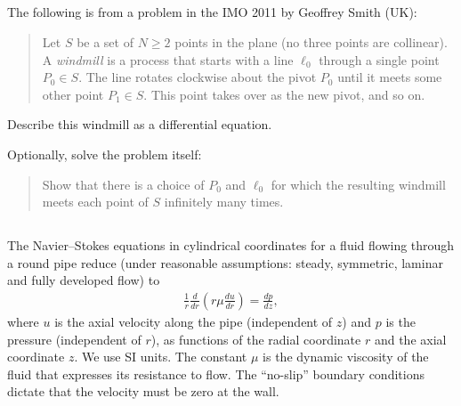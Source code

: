\documentclass[12pt,a4paper]{article}
\begin{document}
    

    \subsection{}
    
    The following is from a problem 
    in the IMO 2011
    by Geoffrey Smith (UK):
    \begin{quote}
        Let $S$ be a set of $N \geq 2$ points in the plane (no three points are collinear). 
        A \emph{windmill} 
        is a process that 
        starts with a line $\ell_0$ through a single point $P_0 \in S$. 
        The line rotates clockwise about the pivot $P_0$ until 
        it meets some other point $P_1 \in S$. 
        This point takes over as the new pivot, and so on.
    \end{quote}
    Describe this windmill as a differential equation.
    
    Optionally, solve the problem itself:
    \begin{quote}
        Show that there is a choice of $P_0$ and $\ell_0$
        for which
        the resulting windmill 
        meets each point of $S$ infinitely many times.
    \end{quote}
    
    
    
    \subsection{}
    
    The Navier--Stokes equations 
    in cylindrical coordinates
    for a fluid flowing
    through a round pipe
    reduce 
    (under reasonable assumptions: steady, symmetric, laminar and fully developed flow)
    to 
    \begin{align}
        \frac{1}{r}
        \frac{d}{dr} \left( r \mu \frac{d u}{dr} \right)
        =
        \frac{d p}{d z}
        ,
    \end{align}
    where $u$ is the axial velocity along the pipe
    (independent of $z$)
    and $p$ is the pressure
    (independent of $r$),
    as functions of the radial coordinate $r$ and the axial coordinate $z$.
    We use SI units.
    The constant $\mu$ is the dynamic viscosity of the fluid
    that expresses its resistance to flow.
    The ``no-slip'' boundary conditions 
    dictate that 
    the velocity must be zero at the wall.
    
\end{document}
